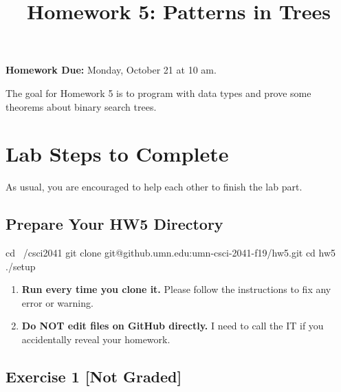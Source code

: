 \documentclass[fleqn]{article}
\title{Homework 5: Patterns in Trees}
\author{}\date{}
\begin{document}

\maketitle

\textbf{Homework Due:} Monday, October 21 at 10 am.

The goal for Homework 5 is to program with data types and prove some theorems about binary search trees.

\section{Lab Steps to Complete}

As usual, you are encouraged to help each other to finish the lab part.

\subsection*{Prepare Your HW5 Directory}

\begin{shellcode}
cd ~/csci2041
git clone git@github.umn.edu:umn-csci-2041-f19/hw5.git
cd hw5
./setup
\end{shellcode}

\begin{enumerate}
\item
  \textbf{Run  every time you clone it.} Please follow the
  instructions to fix any error or warning.
\item
  \textbf{Do NOT edit files on GitHub directly.} I need to call the IT
  if you accidentally reveal your homework.
\end{enumerate}

\subsection*{Exercise 1 [Not Graded]}
\end{document}

